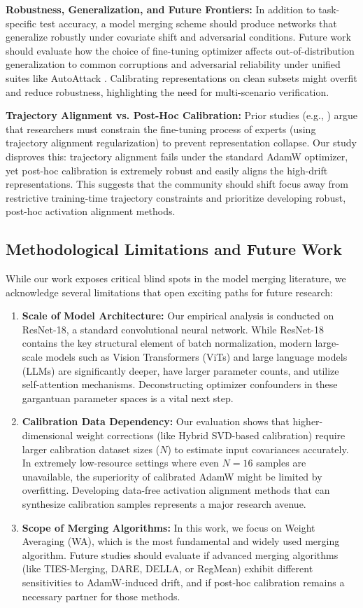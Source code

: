 \documentclass{article}
\theoremstyle{plain}
\theoremstyle{definition}
\theoremstyle{remark}
\begin{document}
\textbf{Robustness, Generalization, and Future Frontiers:} In addition to task-specific test accuracy, a model merging scheme should produce networks that generalize robustly under covariate shift and adversarial conditions. Future work should evaluate how the choice of fine-tuning optimizer affects out-of-distribution generalization to common corruptions \cite{hendrycks2019benchmarking} and adversarial reliability under unified suites like AutoAttack \cite{croce2020reliable}. Calibrating representations on clean subsets might overfit and reduce robustness, highlighting the need for multi-scenario verification.

\textbf{Trajectory Alignment vs. Post-Hoc Calibration:} Prior studies (e.g., \cite{sptaac2026}) argue that researchers must constrain the fine-tuning process of experts (using trajectory alignment regularization) to prevent representation collapse. Our study disproves this: trajectory alignment fails under the standard AdamW optimizer, yet post-hoc calibration is extremely robust and easily aligns the high-drift representations. This suggests that the community should shift focus away from restrictive training-time trajectory constraints and prioritize developing robust, post-hoc activation alignment methods.

\subsection{Methodological Limitations and Future Work}
While our work exposes critical blind spots in the model merging literature, we acknowledge several limitations that open exciting paths for future research:
\begin{enumerate}
    \item \textbf{Scale of Model Architecture:} Our empirical analysis is conducted on ResNet-18, a standard convolutional neural network. While ResNet-18 contains the key structural element of batch normalization, modern large-scale models such as Vision Transformers (ViTs) and large language models (LLMs) are significantly deeper, have larger parameter counts, and utilize self-attention mechanisms. Deconstructing optimizer confounders in these gargantuan parameter spaces is a vital next step.
    \item \textbf{Calibration Data Dependency:} Our evaluation shows that higher-dimensional weight corrections (like Hybrid SVD-based calibration) require larger calibration dataset sizes ($N$) to estimate input covariances accurately. In extremely low-resource settings where even $N=16$ samples are unavailable, the superiority of calibrated AdamW might be limited by overfitting. Developing data-free activation alignment methods that can synthesize calibration samples represents a major research avenue.
    \item \textbf{Scope of Merging Algorithms:} In this work, we focus on Weight Averaging (WA), which is the most fundamental and widely used merging algorithm. Future studies should evaluate if advanced merging algorithms (like TIES-Merging, DARE, DELLA, or RegMean) exhibit different sensitivities to AdamW-induced drift, and if post-hoc calibration remains a necessary partner for those methods.
\end{enumerate}
\end{document}
